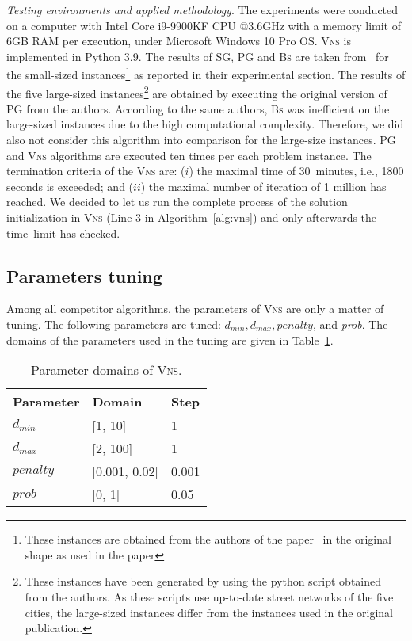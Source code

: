 \documentclass[dvipsnames,format=sigconf,anonymous=true,review=true]{acmart}
\begin{document}
 
 \emph{Testing environments and applied methodology}. The experiments were conducted  on a computer with Intel Core i9-9900KF CPU @3.6GHz with a memory limit of 6GB RAM per execution, under Microsoft Windows 10 Pro OS. \textsc{Vns}  is implemented in Python 3.9. The results of \textsc{SG}, \textsc{PG} and \textsc{Bs} are taken from~\cite{corcoran2021heuristics} for the small-sized instances\footnote{These instances are obtained from the authors of the paper~\cite{corcoran2021heuristics} in the original shape as used in the paper} as reported in their experimental section. The results of the  five large-sized instances\footnote{These instances have been generated by using the python script obtained from the authors. As these  scripts use  up-to-date street networks of the five cities, the large-sized instances differ from the instances used in the original publication. } are obtained by executing the original version of \textsc{PG} from the authors. According to the same authors,  \textsc{Bs} was inefficient  on the large-sized instances due to
 the high computational complexity. Therefore, we did also not consider this algorithm into comparison for the large-size instances.  
 \textsc{PG} and \textsc{Vns} algorithms are executed ten times per each problem instance.  The termination criteria of the \textsc{Vns} are: ($i$) the maximal time of 30~minutes, i.e., 1800 seconds is exceeded; and ($ii$) the maximal number of iteration of 1 million has reached. We decided to let us run the complete process of the solution initialization in \textsc{Vns} (Line 3 in Algorithm~\ref{alg:vns})  and only afterwards the time--limit has checked.  
\subsection{Parameters tuning}
   Among all competitor algorithms, the parameters of \textsc{Vns} are only a matter of tuning. The following parameters are tuned: $d_{min}, d_{max}, penalty$, and \emph{prob}.  The domains of the parameters used in the tuning are given in Table~\ref{tab:domain_tuning}.
   
    \begin{table}[ht]
    	\caption{Parameter domains of \textsc{Vns}.}  
    	\label{tab:domain_tuning}
   	\begin{tabular}{lll}
    Parameter       & Domain & Step \\ \hline
   	$d_{min}$  &  [1, 10] & 1 \\
   	$d_{max}$  & [2, 100] & 1\\
   	 $penalty$ & [0.001, 0.02]  & 0.001 \\
   	 $prob$    & [0, 1] & 0.05 \\ \hline
   	\end{tabular}
   \end{table}
   
\end{document}
